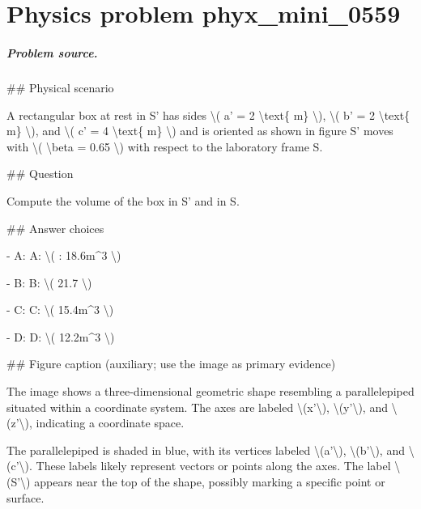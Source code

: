 
\chapter{Physics problem phyx\_mini\_0559}
\label{ch:PhyXMiniProblems_problem_phyx_mini_0559}

\paragraph{Problem source.}
\#\# Physical scenario

A rectangular box at rest in S' has sides \textbackslash{}( a' = 2 \textbackslash{}text\{ m\} \textbackslash{}), \textbackslash{}( b' = 2 \textbackslash{}text\{ m\} \textbackslash{}), and \textbackslash{}( c' = 4 \textbackslash{}text\{ m\} \textbackslash{}) and is oriented as shown in figure S' moves with \textbackslash{}( \textbackslash{}beta = 0.65 \textbackslash{}) with respect to the laboratory frame S.

\#\# Question

Compute the volume of the box in S' and in S.

\#\# Answer choices

- A: A: \textbackslash{}( : 18.6m\textasciicircum{}3 \textbackslash{})

- B: B: \textbackslash{}( 21.7 \textbackslash{})

- C: C: \textbackslash{}( 15.4m\textasciicircum{}3 \textbackslash{})

- D: D: \textbackslash{}( 12.2m\textasciicircum{}3 \textbackslash{})

\#\# Figure caption (auxiliary; use the image as primary evidence)

The image shows a three-dimensional geometric shape resembling a parallelepiped situated within a coordinate system. The axes are labeled \textbackslash{}(x'\textbackslash{}), \textbackslash{}(y'\textbackslash{}), and \textbackslash{}(z'\textbackslash{}), indicating a coordinate space. 

The parallelepiped is shaded in blue, with its vertices labeled \textbackslash{}(a'\textbackslash{}), \textbackslash{}(b'\textbackslash{}), and \textbackslash{}(c'\textbackslash{}). These labels likely represent vectors or points along the axes. The label \textbackslash{}(S'\textbackslash{}) appears near the top of the shape, possibly marking a specific point or surface.

